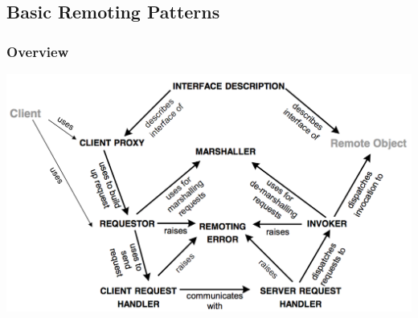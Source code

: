 \documentclass[10pt]{article}
\begin{document}
\subsection{Basic Remoting Patterns}
\subsubsection{Overview}
\begin{center}
	\includegraphics[scale=0.25]{images/basic-remote-patterns.png}
\end{center}
\end{document}
